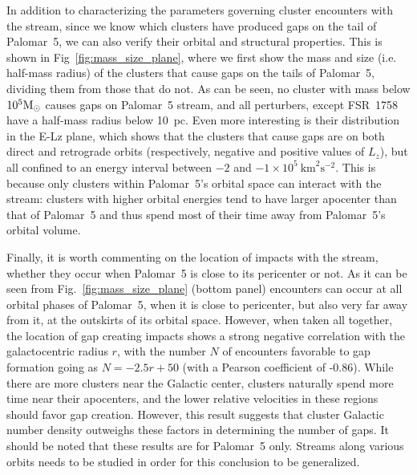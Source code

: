 \documentclass[draft]{aa}
\begin{document}
    In addition to characterizing the parameters governing cluster encounters with the stream, since we know which clusters have produced gaps on the tail of Palomar~5, we can also verify their orbital and structural properties. This is shown in Fig~\ref{fig:mass_size_plane}, where we first show the mass and size (i.e. half-mass radius) of the clusters that cause gaps on the tails of Palomar~5, dividing them from those that do not. As can be seen, no cluster with mass below $10^5 \rm{M}_\odot$ causes gaps on Palomar~5 stream, and all perturbers, except FSR~1758 have a half-mass radius below 10~pc. Even more interesting is their distribution in the E-Lz plane, which shows that the clusters that cause gaps are on both direct and retrograde orbits (respectively, negative and positive values of $L_z$), but all confined to an energy interval between $-2$ and $-1 \times10^5~\textrm{km}^2\textrm{s}^{-2}$. This is because only clusters within Palomar~5's orbital space can interact with the stream: clusters with higher orbital energies tend to have larger apocenter than that of Palomar~5 and thus spend most of their time away from Palomar~5's orbital volume. 
    
    Finally, it is worth commenting on the location of impacts with the stream, whether they occur when Palomar~5 is close to its pericenter or not. As it can be seen from Fig.~\ref{fig:mass_size_plane} (bottom panel) encounters can occur at all orbital phases of Palomar~5, when it is close to pericenter, but also very far away from it, at the outskirts of its orbital space. However, when taken all together, the location of gap creating impacts shows a strong negative correlation with the galactocentric radius $r$, with the number $N$ of encounters favorable to gap formation  going as $N = -2.5r + 50$ (with a Pearson coefficient of -0.86). While there are more clusters near the Galactic center, clusters naturally spend more time near their apocenters, and the lower relative velocities in these regions should favor gap creation. However, this result suggests that cluster Galactic number density outweighs these factors in determining the number of gaps. It should be noted that these results are for Palomar~5 only. Streams along various orbits needs to be studied in order for this conclusion to be generalized. 

\end{document}
